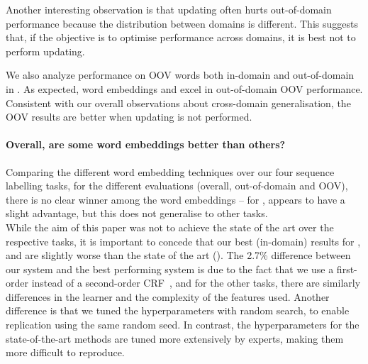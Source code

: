 Another interesting observation is that updating often hurts
out-of-domain performance because the distribution between domains is different. 
This suggests that, if the objective is to optimise performance across
domains, it is best not to perform updating. 

We also analyze performance on OOV words both in-domain and
out-of-domain in .
As expected, word embeddings and \brown excel in out-of-domain OOV performance.
Consistent with our overall observations about cross-domain
generalisation, the OOV results are better when updating is not performed. 

\paragraph{\RQ[5] Overall, are some word embeddings better than others?}
Comparing the different word embedding techniques over our four sequence
labelling tasks, for the different evaluations (overall, out-of-domain
and OOV), there is no clear winner among the word embeddings -- for
\pos, \Skipgram appears to have a slight advantage, but this does not
generalise to other tasks.\\

While the aim of this paper was not to achieve the state of the art over
the respective tasks, it is important to concede that our best
(in-domain) results for \ner, \pos and \chunking are
slightly worse than the state of the art
(). The 2.7\% difference between our \ner system and
the best performing system is due to the fact that we use a first-order
instead of a second-order CRF~\cite{Ando:2005}, and for the other tasks,
there are similarly differences in the learner and the complexity of the
features used.
Another difference is that we tuned the hyperparameters with random
search, to enable replication using the same random seed.
In contrast, the hyperparameters for the state-of-the-art methods are
tuned more extensively by experts, making them more difficult to reproduce.











